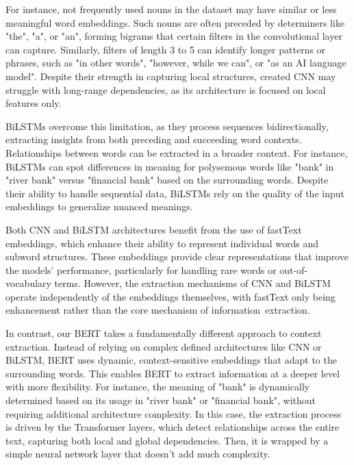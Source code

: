 \vspace{3mm}

For instance, not frequently used nouns in the dataset may have similar or less meaningful word embeddings. Such nouns are often preceded by determiners like "the", "a", or "an", forming bigrams that certain filters in the convolutional layer can capture. Similarly, filters of length 3 to 5 can identify longer patterns or phrases, such as "in other words", "however, while we can", or "as an AI language model". Despite their strength in capturing local structures, created CNN may struggle with long-range dependencies, as its architecture is focused on local features only.

\vspace{3mm}

BiLSTMs overcome this limitation, as they process sequences bidirectionally, extracting insights from both preceding and succeeding word contexts. Relationships between words can be extracted in a broader context. For instance, BiLSTMs can spot differences in meaning for polysemous words like "bank" in "river bank" versus "financial bank" based on the surrounding words. Despite their ability to handle sequential data, BiLSTMs rely on the quality of the input embeddings to generalize nuanced meanings.

\vspace{3mm}

Both CNN and BiLSTM architectures benefit from the use of fastText embeddings, which enhance their ability to represent individual words and subword structures. These embeddings provide clear representations that improve the models' performance, particularly for handling rare words or out-of-vocabulary terms. However, the extraction mechanisms of CNN and BiLSTM operate independently of the embeddings themselves, with fastText only being enhancement rather than the core mechanism of information~extraction.

\vspace{3mm}

In contrast, our BERT takes a fundamentally different approach to context extraction. Instead of relying on complex defined architectures like CNN or BiLSTM, BERT uses dynamic, context-sensitive embeddings that adapt to the surrounding words. This enables BERT to extract information at a deeper level with more flexibility. For instance, the meaning of "bank" is dynamically determined based on its usage in "river bank" or "financial bank", without requiring additional architecture complexity. In this case, the extraction process is driven by the Transformer layers, which detect relationships across the entire text, capturing both local and global dependencies. Then, it is wrapped by a simple neural network layer that doesn't add much complexity.


